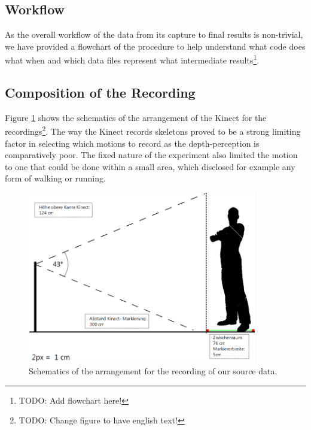 \documentclass[a4paper]{article}
\begin{document}
\subsection{Workflow}

As the overall workflow of the data from its capture to final results is non-trivial, we have provided a flowchart of the procedure to help understand what code does what when and which data files represent what intermediate results\footnote{TODO: Add flowchart here!}.

\subsection{Composition of the Recording}

Figure \ref{fig:schematic} shows the schematics of the arrangement of the Kinect for the recordings\footnote{TODO: Change figure to have english text!}. The way the Kinect records skeletons proved to be a strong limiting factor in selecting which motions to record as the depth-perception is comparatively poor. The fixed nature of the experiment also limited the motion to one that could be done within a small area, which disclosed for example any form of walking or running.

\begin{figure}
	\centering
	\includegraphics[width=10cm]{Aufbau.png}
	\caption{Schematics of the arrangement for the recording of our source data.}
	\label{fig:schematic}
\end{figure}

\newpage

\end{document}
